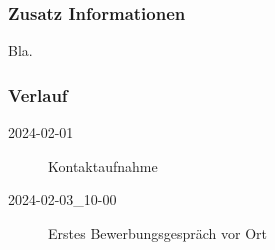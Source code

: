 \documentclass{scrartcl}
\begin{document}
    \subsubsection{Zusatz Informationen}\label{subsubsec:zusatz-informationen}
    Bla.

    \subsubsection{Verlauf}\label{subsubsec:verlauf}
    \begin{description}
        \item[2024-02-01] Kontaktaufnahme
        \item[2024-02-03\_10-00] Erstes Bewerbungsgespräch vor Ort
    \end{description}

\end{document}
